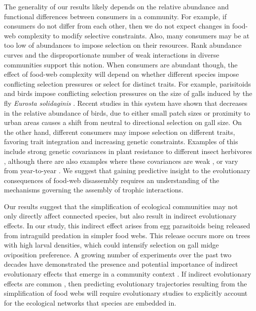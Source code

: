 \documentclass[11pt,]{article}
\begin{document}
The generality of our results likely depends on the relative abundance
and functional differences between consumers in a community. For
example, if consumers do not differ from each other, then we do not
expect changes in food-web complexity to modify selective constraints.
Also, many consumers may be at too low of abundances to impose selection
on their resources. Rank abundance curves \citep{Preston1948} and the
disproportionate number of weak interactions in diverse communities
\citep{Paine1992} support this notion. When consumers are abundant
though, the effect of food-web complexity will depend on whether
different species impose conflicting selection pressures or select for
distinct traits. For example, parisitoids and birds impose conflicting
selection pressures on the size of galls induced by the fly
\emph{Eurosta solidaginis} \citep{Weis1985, Abrahamson1997}. Recent
studies in this system have shown that decreases in the relative
abundance of birds, due to either small patch sizes \citep{Start2016} or
proximity to urban areas \citep{Start2018} causes a shift from neutral
to directional selection on gall size. On the other hand, different
consumers may impose selection on different traits, favoring trait
integration and increasing genetic constraints. Examples of this include
strong genetic covariances in plant resistance to different insect
herbivores \citep{Maddox1990, Wise2007, Wise2013}, although there are
also examples where these covariances are weak
\citep{Roche1997, Barbour2015}, or vary from year-to-year
\citep{Johnson2007}. We suggest that gaining predictive insight to the
evolutionary consequences of food-web disassembly requires an
understanding of the mechanisms governing the assembly of trophic
interactions.

Our results suggest that the simplification of ecological communities
may not only directly affect connected species, but also result in
indirect evolutionary effects. In our study, this indirect effect arises
from egg parasitoids being released from intraguild predation in simpler
food webs. This release occurs more on trees with high larval densities,
which could intensify selection on gall midge oviposition preference. A
growing number of experiments over the past two decades have
demonstrated the presence and potential importance of indirect
evolutionary effects that emerge in a community context
\citep{Juenger1998, Stinchcombe2001, Lankau2007, Walsh2008, Walsh2010, terHorst2010, Sahli2011, Lau2012, terHorst2015, Schiestl2018, StartInPress}.
If indirect evolutionary effects are common \citep{Walsh2013}, then
predicting evolutionary trajectories resulting from the simplification
of food webs will require evolutionary studies to explicitly account for
the ecological networks that species are embedded in.
\end{document}
